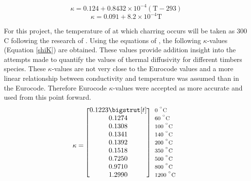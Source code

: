  \begin{equation}\label{softconeq}
 \kappa = 0.124 +0.8432 \times 10^{-4}  (\text{T}-293) 
 \end{equation}
 \begin{equation}\label{charconeq}
 \kappa = 0.091 + 8.2 \times 10^{-4} \text{T}
 \end{equation}
 
 For this project, the temperature of at which charring occurs will be taken as 300 \textdegree C following the research of \citeauthor{Westhuyzen:2020}. 
 Using the equations of \citeauthor{Shi:2021}, the following $\kappa$-values  (Equation \ref{shiK}) are obtained. 
 These values provide addition insight into the attempts made to quantify the values of thermal diffusivity for different timbers species.
These $\kappa$-values are not very close to the Eurocode values and a more linear relationship between conductivity and temperature  was assumed than in the Eurocode.
  Therefore Eurocode $\kappa$-values were accepted as more accurate and used from this point forward.
\begin{equation}\label{shiK}
  \kappa=
  \begin{blockarray}{*{1}{c} l}
    \begin{block}{[*{1}{c}]>{$\footnotesize}l<{$}}
     	0.1223\bigstrut[t] & 0 $^{^\circ} \text{C}$\\
		 0.1274& 60  $^{^\circ} \text{C}$\\ 
		0.1308 & 100 $^{^\circ} \text{C}$\\ 
		0.1341& 140 $^{^\circ} \text{C}$\\ 
		0.1392& 200 $^{^\circ} \text{C}$\\ 
		0.1518& 350 $^{^\circ} \text{C}$\\
		0.7250& 500 $^{^\circ} \text{C}$\\ 
		0.9710& 800 $^{^\circ} \text{C}$\\ 
		1.2990& 1200 $^{^\circ} \text{C}$\\
    \end{block}
  \end{blockarray}
\end{equation}
